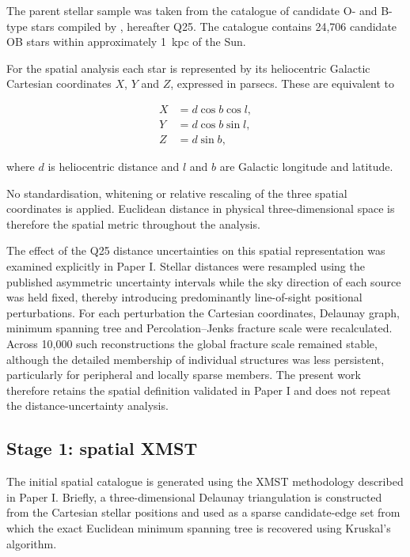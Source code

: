 \documentclass[fleqn,usenatbib]{rasti}
\begin{document}
The parent stellar sample was taken from the catalogue of candidate O- and
B-type stars compiled by \citet{Quintana2025}, hereafter Q25. The catalogue
contains 24,706 candidate OB stars within approximately 1~kpc of the Sun.

For the spatial analysis each star is represented by its heliocentric
Galactic Cartesian coordinates $X$, $Y$ and $Z$, expressed in parsecs.
These are equivalent to

\begin{align}
X &= d \cos b \cos l,\\
Y &= d \cos b \sin l,\\
Z &= d \sin b,
\end{align}

where $d$ is heliocentric distance and $l$ and $b$ are Galactic longitude
and latitude.

No standardisation, whitening or relative rescaling of the three spatial
coordinates is applied. Euclidean distance in physical three-dimensional
space is therefore the spatial metric throughout the analysis.

The effect of the Q25 distance uncertainties on this spatial representation was examined explicitly in Paper I. Stellar distances were resampled using the published asymmetric uncertainty intervals while the sky direction of each source was held fixed, thereby introducing predominantly line-of-sight positional perturbations. For each perturbation the Cartesian coordinates, Delaunay graph, minimum spanning tree and Percolation--Jenks fracture scale were recalculated. Across 10,000 such reconstructions the global fracture scale remained stable, although the detailed membership of individual structures was less persistent, particularly for peripheral and locally sparse members. The present work therefore retains the spatial definition validated in Paper I and does not repeat the distance-uncertainty analysis.

\subsection{Stage 1: spatial XMST}

The initial spatial catalogue is generated using the XMST methodology
described in Paper I. Briefly, a three-dimensional Delaunay triangulation
is constructed from the Cartesian stellar positions and used as a sparse
candidate-edge set from which the exact Euclidean minimum spanning tree is
recovered using Kruskal's algorithm.
\end{document}
